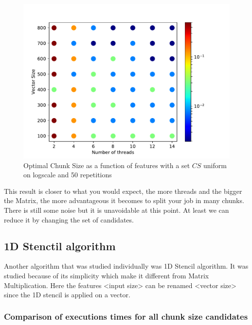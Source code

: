 \documentclass[12pt]{article}
\begin{document}
\begin{figure}[H]
	\centering
	\includegraphics[width=120mm]{images/chunk_size_function_matrix_uniform_log_50rep.pdf}
	\caption{Optimal Chunk Size as a function of features with a set $CS$ uniform on logscale and 50 repetitions}
\end{figure}

This result is closer to what you would expect, the more threads and the bigger the Matrix, the more advantageous it becomes to split your job in many chunks. There is still some noise but it is unavoidable at this point. At least we can reduce it by changing the set of candidates.
\subsection{1D Stenctil algorithm}

Another algorithm that was studied individually was 1D Stencil algorithm. It was studied because of its simplicity which make it different from Matrix Multiplication. Here the features <input size> can be renamed <vector size> since the 1D stencil is applied on a vector.
\subsubsection{Comparison of executions times for all chunk size candidates}
\end{document}
